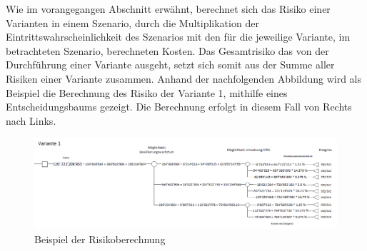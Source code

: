 %
%
%
%

\label{subsec:BerechnungRisiken}


Wie im vorangegangen Abschnitt erwähnt, berechnet sich das Risiko einer Varianten in einem Szenario, durch die Multiplikation der Eintrittswahrscheinlichkeit des Szenarios mit den für die jeweilige Variante, im betrachteten Szenario, berechneten Kosten. Das Gesamtrisiko das von der Durchführung einer Variante ausgeht, setzt sich somit aus der Summe aller Risiken einer Variante zusammen. 
Anhand der nachfolgenden Abbildung wird als Beispiel die Berechnung des Risiko der Variante 1, mithilfe eines Entscheidungsbaums gezeigt. Die Berechnung erfolgt in diesem Fall von Rechts nach Links.


\begin{figure}[h!]
	\centering
	\includegraphics[width=\textwidth]{figures/f-04-08-01-Risikoberechnung}
	\caption[Risikoberechnung]{Beispiel der Risikoberechnung}
	\label{img:Risikoberechnung}
\end{figure}




%

